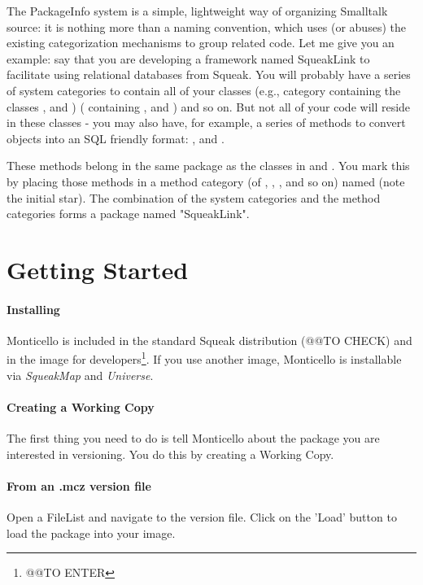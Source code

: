 \documentclass[a4paper,10pt,twoside]{book}
\begin{document}
The PackageInfo system is a simple, lightweight way of organizing Smalltalk source: it is nothing more than a naming convention, which uses (or abuses) the existing categorization mechanisms to group related code. Let me give you an example: say that you are developing a framework named SqueakLink to facilitate using relational databases from Squeak. You will probably have a series of system categories to contain all of your classes (e.g., category  containing the classes ,  and )
( containing ,   and ) and so on. But not all of your code will reside in these classes - you may also have, for example, a series of methods to convert objects into an SQL friendly format: ,   and .

These methods belong in the same package as the classes in  and . You mark this by placing those methods in a method category (of , , , and so on) named  (note the initial star). The combination of the  system categories and the  method categories forms a package named "SqueakLink".


\section{Getting Started}

\paragraph{Installing}

Monticello is included in the standard Squeak distribution (@@TO CHECK) and in the image for developers\footnote{@@TO ENTER}. If you use another image, Monticello is installable via \emph{SqueakMap} and \emph{Universe}.


\paragraph{Creating a Working Copy}

The first thing you need to do is tell Monticello about the package you are interested in versioning. You do this by creating a Working Copy.

\paragraph{From an .mcz version file}
Open a FileList and navigate to the version file. Click on the 'Load' button to load the package into your image.
\end{document}
